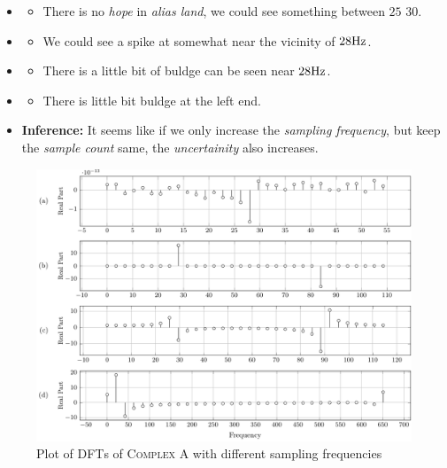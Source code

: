 \documentclass[../../course]{subfiles}
\begin{document}
\begin{itemize} [label=]

    \item \sampFreqMuchLess
        \begin{itemize} [label=]
            \item There is no \emph{hope} in \emph{alias land}, we could see
                something between $25$ $30$.
        \end{itemize}

    \item \sampFreqNorm
        \begin{itemize} [label=]
            \item We could see a spike at somewhat near the vicinity of $\freqXOne \si{Hz}$.
        \end{itemize}

    \item \sampFreqSligGreat
        \begin{itemize} [label=]
            \item There is a little bit of buldge can be seen near $\freqXOne \si{Hz}$.
        \end{itemize}

    \item \sampFreqMuchGreat
        \begin{itemize} [label=]
            \item There is little bit buldge at the left end.
        \end{itemize}

    \item \textbf{Inference:} It seems like if we only increase the \emph{sampling frequency},
        but keep the \emph{sample count} same, the \emph{uncertainity} also increases.

\end{itemize}

\vfill

\begin{figure} [H]
    \centering
     {
        \includegraphics[height = 0.8\textheight] {tikzpics/plotDftComplexA32.pdf}
    }
     {Plot of \textsc{DFT}s of \textsc{Complex A} with different sampling frequencies}
    \label{plt:dftComplexA}
\end{figure}
\end{document}
